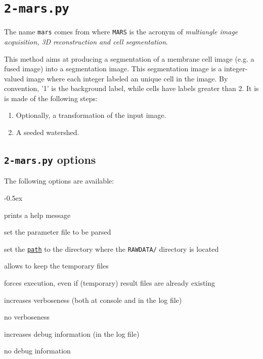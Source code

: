 \section{\texttt{2-mars.py}}
\label{sec:cli:mars}

The name \texttt{mars} comes from \cite{fernandez:hal-00521491} where \texttt{MARS} is the acronym of \textit{multiangle image acquisition, 3D reconstruction and cell segmentation}.

This method aims at producing a segmentation of a membrane cell image (e.g.  a fused image) into a segmentation image. This segmentation image is a integer-valued image where each integer labeled an unique cell in the image. By convention, '1' is the background label, while cells have labels greater than 2. It is  is made of the following steps:
\begin{enumerate}
\itemsep -0.5ex
\item  Optionally, a transformation of the input image.
\item A seeded watershed.
\end{enumerate}


\subsection{\texttt{2-mars.py} options}

The following options are available:
\begin{description}
  \itemsep -0.5ex
\item[\texttt{-h}] prints a help message
\item[\texttt{-p \underline{file}}] set the parameter file to be parsed
\item[\texttt{-e \underline{path}}] set the
  \texttt{\underline{path}} to the directory where the
  \texttt{RAWDATA/} directory is located
\item[\texttt{-k}] allows to keep the temporary files
\item[\texttt{-f}] forces execution, even if (temporary) result files
  are already existing
\item[\texttt{-v}] increases verboseness (both at console and in the
  log file)
\item[\texttt{-nv}] no verboseness
\item[\texttt{-d}]  increases debug information (in the
  log file)
\item[\texttt{-nd}] no debug information
\end{description}



